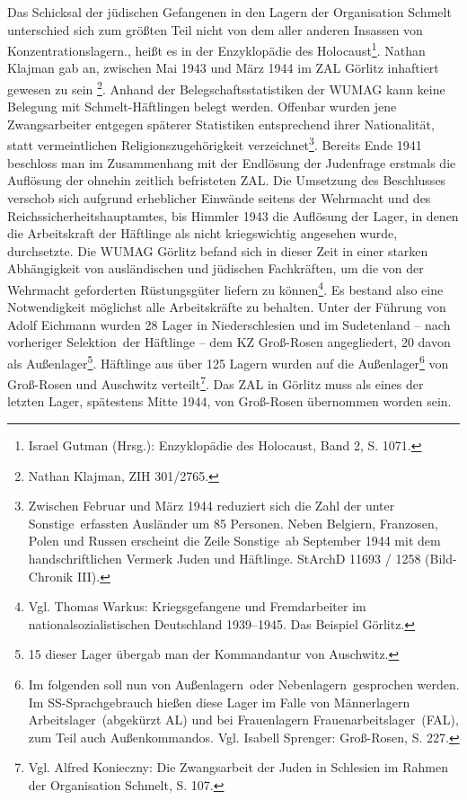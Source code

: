 \documentclass[a4paper,12pt,ngerman,
]{nisebook}
\begin{document}
\glqq Das Schicksal der jüdischen Gefangenen in den Lagern der Organisation Schmelt unterschied sich zum größten Teil nicht von dem aller anderen Insassen von Konzentrationslagern.\grqq, heißt es in der Enzyklopädie des Holocaust\footnote{Israel Gutman (Hrsg.): Enzyklopädie des Holocaust, Band 2, S. 1071.}.
\newline
Nathan Klajman gab an, zwischen Mai 1943 und März 1944 im ZAL Görlitz inhaftiert gewesen zu sein
\footnote{Nathan Klajman, ZIH 301/2765.}. Anhand der Belegschaftsstatistiken der WUMAG kann keine Belegung mit Schmelt-Häftlingen belegt werden. Offenbar wurden jene Zwangsarbeiter entgegen späterer Statistiken entsprechend ihrer Nationalität, statt vermeintlichen Religionszugehörigkeit verzeichnet\footnote{Zwischen Februar und März 1944 reduziert sich die Zahl der unter \glqq Sonstige\grqq~erfassten Ausländer um 85 Personen. Neben Belgiern, Franzosen, Polen und Russen erscheint die Zeile \glqq Sonstige\grqq~ab September 1944 mit dem handschriftlichen Vermerk \glqq Juden und Häftlinge\grqq. StArchD 11693 / 1258 (Bild-Chronik III).}.
\newline
Bereits Ende 1941 beschloss man im Zusammenhang mit der Endlösung der Judenfrage erstmals die Auflösung der ohnehin zeitlich befristeten ZAL. Die Umsetzung des Beschlusses verschob sich aufgrund erheblicher Einwände seitens der Wehrmacht und des Reichssicherheitshauptamtes, bis Himmler 1943 die Auflösung der Lager, in denen die Arbeitskraft der Häftlinge als nicht kriegswichtig angesehen wurde, durchsetzte. Die WUMAG Görlitz befand sich in dieser Zeit in einer starken Abhängigkeit von ausländischen und jüdischen Fachkräften, um die von der Wehrmacht geforderten Rüstungsgüter liefern zu können\footnote{Vgl. Thomas Warkus: Kriegsgefangene und Fremdarbeiter im nationalsozialistischen Deutschland 1939--1945. Das Beispiel Görlitz.}. Es bestand also eine Notwendigkeit möglichst alle Arbeitskräfte zu behalten.
Unter der Führung von Adolf Eichmann wurden 28 Lager in Niederschlesien und im Sudetenland -- nach vorheriger \glqq Selektion\grqq~der Häftlinge -- dem KZ Groß-Rosen angegliedert, 20 davon als Außenlager\footnote{15 dieser Lager übergab man der Kommandantur von Auschwitz.}. Häftlinge aus über 125 Lagern wurden auf die Außenlager\footnote{Im folgenden soll nun von \glqq Außenlagern\grqq~oder \glqq Nebenlagern\grqq~gesprochen werden. Im SS-Sprachgebrauch hießen diese Lager im Falle von Männerlagern \glqq Arbeitslager\grqq~(abgekürzt AL) und bei Frauenlagern \glqq Frauenarbeitslager\grqq~(FAL), zum Teil auch \glqq Außenkommandos\grqq. Vgl. Isabell Sprenger: Groß-Rosen, S. 227.} von Groß-Rosen und Auschwitz verteilt\footnote{Vgl. Alfred Konieczny: Die Zwangsarbeit der Juden in Schlesien im Rahmen der Organisation Schmelt, S. 107.}. Das ZAL in Görlitz muss als eines der letzten Lager, spätestens Mitte 1944, von Groß-Rosen übernommen worden sein.
\end{document}

